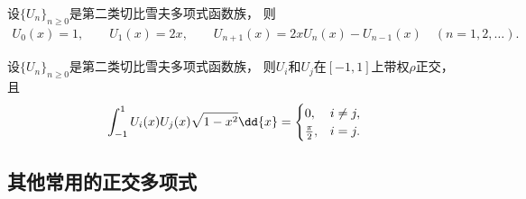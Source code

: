 \begin{property}
设\(\{U_n\}_{n\geq0}\)是第二类切比雪夫多项式函数族，
则\begin{gather}
	U_0(x) = 1,
	\qquad
	U_1(x) = 2x,
	\qquad
	U_{n+1}(x) = 2x U_n(x) - U_{n-1}(x)
	\quad(n=1,2,\dotsc).
\end{gather}
\end{property}

\begin{property}
设\(\{U_n\}_{n\geq0}\)是第二类切比雪夫多项式函数族，
则\(U_i\)和\(U_j\)在\([-1,1]\)上带权\(\rho\)正交，
且\begin{equation}
	\def\arraystretch{1.5}
	\int_{-1}^1 U_i(x) U_j(x) \sqrt{1-x^2} \dd{x}
	= \begin{cases}
		0, & i \neq j, \\
		\frac\pi2, & i = j.
	\end{cases}
\end{equation}
\end{property}

\subsection{其他常用的正交多项式}
